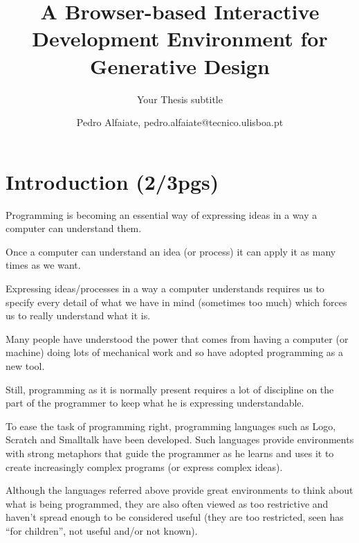 \documentclass{./llncs2e/llncs}
\begin{document}
\title{A Browser-based Interactive Development Environment for Generative Design}

\subtitle{Your Thesis subtitle}
\author{Pedro Alfaiate, pedro.alfaiate@tecnico.ulisboa.pt}

\maketitle

\begin{abstract}

\end{abstract}
\begin{keywords}

\end{keywords}
\section{Introduction (2/3pgs)}
	Programming is becoming an essential way of expressing ideas in a way a computer can understand them.

	Once a computer can understand an idea (or process) it can apply it as many times as we want.

	Expressing ideas/processes in a way a computer understands requires us to specify every detail of what we have in mind (sometimes too much) which forces us to really understand what it is.

	Many people have understood the power that comes from having a computer (or machine) doing lots of mechanical work and so have adopted programming as a new tool.

	Still, programming as it is normally present requires a lot of discipline on the part of the programmer to keep what he is expressing understandable.

	To ease the task of programming right, programming languages such as Logo\cite{papert1999logo}, Scratch\cite{Resnick:2009:SP:1592761.1592779} and Smalltalk\cite{goldberg1983smalltalk} have been developed. Such languages provide environments with strong metaphors that guide the programmer as he learns and uses it to create increasingly complex programs (or express complex ideas).

	Although the languages referred above provide great environments to think about what is being programmed, they are also often viewed as too restrictive and haven't spread enough to be considered useful (they are too restricted, seen has ``for children'', not useful and/or not known).
\end{document}
